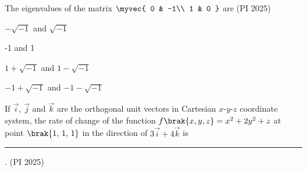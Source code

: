 \item The eigenvalues of the matrix 
$
\myvec{
0 &  -1\\
1 & 0 
}
$ are
\hfill (PI 2025)
\begin{enumerate}
\begin{multicols}{2}
\item $-\sqrt{-1}$ and $\sqrt{-1}$
\item -1 and 1
\item $1+\sqrt{-1}$ and $1-\sqrt{-1}$
\item $-1+\sqrt{-1}$ and $-1-\sqrt{-1}$
\end{multicols}
\end{enumerate}
\item If $\vec{i}$, $\vec{j}$ and $\vec{k}$ are the orthogonal unit vectors in Cartesian $x$-$y$-$z$ coordinate system, the rate of change of the function $f\brak{x,y,z}=x^{2}+2y^{2}+z$ at point $\brak{1,\,1,\,1}$ in the direction of $3\vec{i}+4\vec{k}$ is \rule{1cm}{0.01pt}. 
\hfill (PI 2025)

